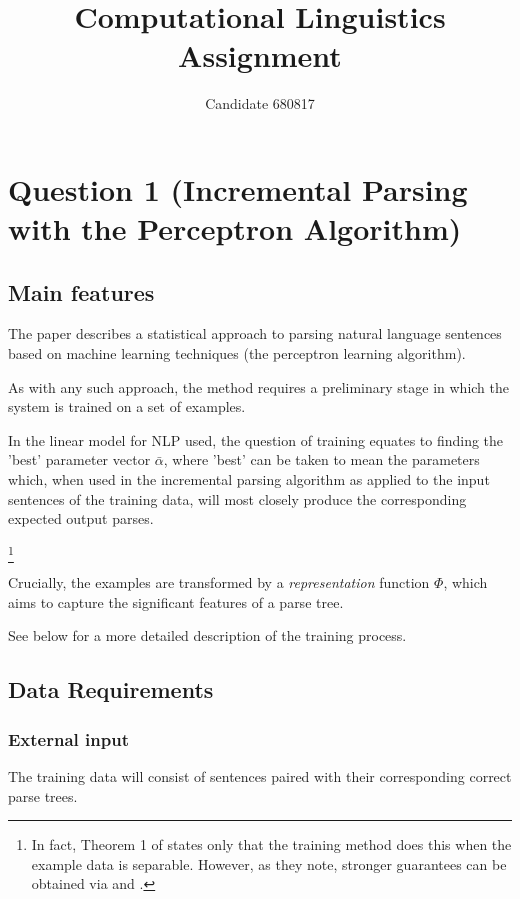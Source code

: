 \documentclass[11pt]{article}
\begin{document}
\title{Computational Linguistics Assignment}
\author{Candidate 680817}
\maketitle

\section*{Question 1 (Incremental Parsing with the Perceptron Algorithm)}
\subsection*{Main features}
The paper \cite{Collins2004} describes a statistical approach to parsing
natural language sentences based on machine learning techniques (the perceptron
learning algorithm). 

As with any such approach, the method requires a preliminary stage in which the
system is trained on a set of examples. 


In the linear model for NLP used, the
question of training equates to finding the 'best' parameter vector
$\bar{\alpha}$, where 'best' can be taken to mean the parameters which, when
used in the incremental parsing algorithm as applied to the input sentences of
the training data, will most closely produce the corresponding expected output
parses.

\footnote{
In fact, Theorem 1 of \cite{Collins2004} states only that the training method does
this when the example data is separable. However, as they note, stronger
guarantees can be obtained via \cite{Freund1999} and \cite{Collins2002}.
}

Crucially, the examples are transformed by a \emph{representation} function
$\Phi$, which aims to capture the significant features of a parse tree.

See below for a more detailed description of the training process.

\subsection*{Data Requirements}

\subsubsection*{External input}
The training data will consist of sentences paired with their corresponding
correct parse trees.
\end{document}
